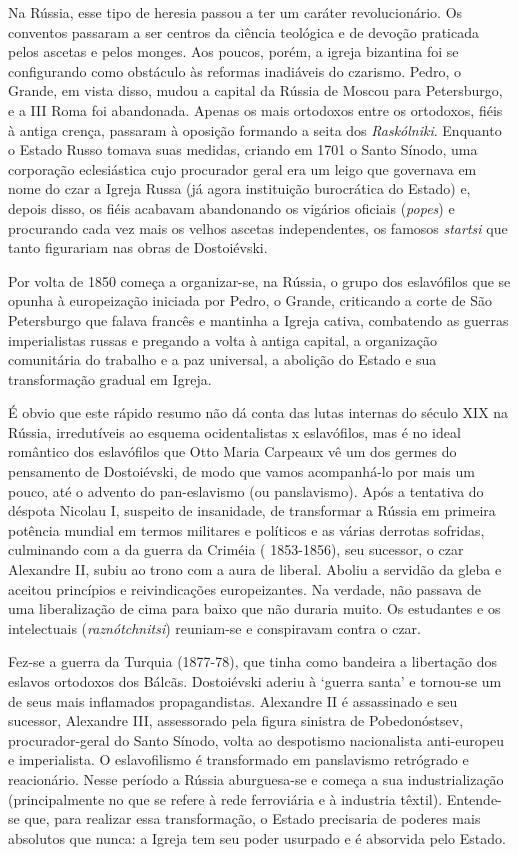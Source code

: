 Na Rússia, esse tipo de heresia passou a ter um caráter revolucionário.
Os conventos passaram a ser centros da ciência teológica e de devoção
praticada pelos ascetas e pelos monges. Aos poucos, porém, a igreja
bizantina foi se configurando como obstáculo às reformas inadiáveis do
czarismo. Pedro, o Grande, em vista disso, mudou a capital da Rússia de
Moscou para Petersburgo, e a III Roma foi abandonada. Apenas os mais
ortodoxos entre os ortodoxos, fiéis à antiga crença, passaram à oposição
formando a seita dos \emph{Raskólniki}. Enquanto o Estado Russo tomava
suas medidas, criando em 1701 o Santo Sínodo, uma corporação
eclesiástica cujo procurador geral era um leigo que governava em nome do
czar a Igreja Russa (já agora instituição burocrática do Estado) e,
depois disso, os fiéis acabavam abandonando os vigários oficiais
(\emph{popes}) e procurando cada vez mais os velhos ascetas
independentes, os famosos \emph{startsi} que tanto figurariam nas obras
de Dostoiévski.

Por volta de 1850 começa a organizar-se, na Rússia, o grupo dos
eslavófilos que se opunha à europeização iniciada por Pedro, o Grande,
criticando a corte de São Petersburgo que falava francês e mantinha a
Igreja cativa, combatendo as guerras imperialistas russas e pregando a
volta à antiga capital, a organização comunitária do trabalho e a paz
universal, a abolição do Estado e sua transformação gradual em Igreja.

É obvio que este rápido resumo não dá conta das lutas internas do século
XIX na Rússia, irredutíveis ao esquema ocidentalistas x eslavófilos, mas
é no ideal romântico dos eslavófilos que Otto Maria Carpeaux vê um dos
germes do pensamento de Dostoiévski, de modo que vamos acompanhá-lo por
mais um pouco, até o advento do pan-eslavismo (ou panslavismo). Após a
tentativa do déspota Nicolau I, suspeito de insanidade, de transformar a
Rússia em primeira potência mundial em termos militares e políticos e as
várias derrotas sofridas, culminando com a da guerra da Criméia (
1853-1856), seu sucessor, o czar Alexandre II, subiu ao trono com a aura
de liberal. Aboliu a servidão da gleba e aceitou princípios e
reivindicações europeizantes. Na verdade, não passava de uma
liberalização de cima para baixo que não duraria muito. Os estudantes e
os intelectuais (\emph{raznótchnitsi}) reuniam-se e conspiravam contra o
czar.

Fez-se a guerra da Turquia (1877-78), que tinha como bandeira a
libertação dos eslavos ortodoxos dos Bálcãs. Dostoiévski aderiu à
`guerra santa' e tornou-se um de seus mais inflamados propagandistas.
Alexandre II é assassinado e seu sucessor, Alexandre III, assessorado
pela figura sinistra de Pobedonóstsev, procurador-geral do Santo Sínodo,
volta ao despotismo nacionalista anti-europeu e imperialista. O
eslavofilismo é transformado em panslavismo retrógrado e reacionário.
Nesse período a Rússia aburguesa-se e começa a sua industrialização
(principalmente no que se refere à rede ferroviária e à industria
têxtil). Entende-se que, para realizar essa transformação, o Estado
precisaria de poderes mais absolutos que nunca: a Igreja tem seu poder
usurpado e é absorvida pelo Estado.

